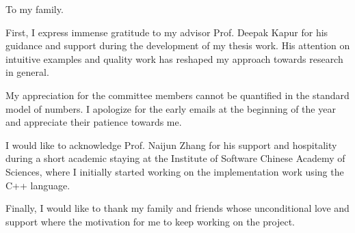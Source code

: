 \begin{dedication}
  To my family.
\end{dedication}

\begin{acknowledgments}
  \vspace{1.1in}

  First, I express immense gratitude to my
  advisor Prof. Deepak Kapur for his guidance 
  and support during the development of my 
  thesis work. His attention on intuitive 
  examples and quality work has
  reshaped my approach towards research in 
  general. 

  My appreciation for the committee members
  cannot be quantified in the standard
  model of numbers. I apologize for the early 
  emails at the beginning of the year and 
  appreciate their patience towards me.

  I would like to acknowledge Prof. Naijun Zhang
  for his support and hospitality during a
  short academic staying at the Institute
  of Software Chinese Academy of Sciences, where
  I initially started working on the 
  implementation work using the C++ language.

  Finally, I would like to thank my family and
  friends whose unconditional love and support 
  where the motivation for me to keep working 
  on the project.

\end{acknowledgments}

